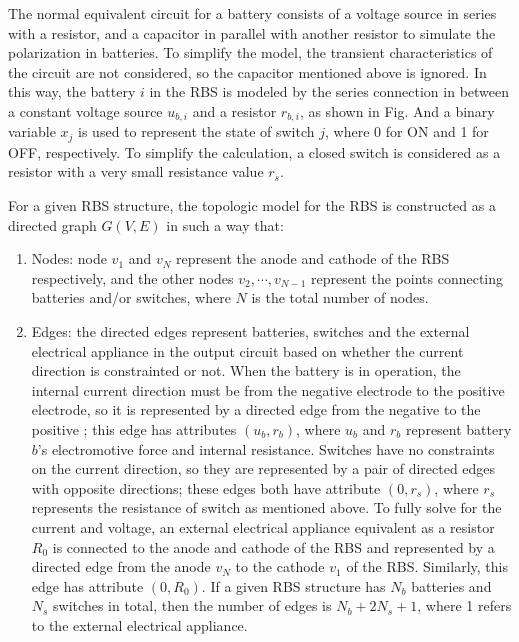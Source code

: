 \documentclass{article}
\begin{document}
The normal equivalent circuit for a battery consists of a voltage source in series with a resistor, and a capacitor in parallel with another resistor to simulate the polarization in batteries.
To simplify the model, the transient characteristics of the circuit are not considered, so the capacitor mentioned above is ignored.
In this way, the battery $i$ in the RBS is modeled by the series connection in between a constant voltage source $u_{b,i}$ and a resistor $r_{b,i}$,  as shown in Fig. %
And a binary variable $x_j$ is used to represent the state of switch $j$, where 0 for ON and 1 for OFF, respectively.
To simplify the calculation, a closed switch is considered as a resistor with a very small resistance value $r_s$.


For a given RBS structure, the topologic model for the RBS is constructed as a directed graph $G(V,E)$ in such a way that:
\begin{enumerate}
    \item Nodes: node $v_1$ and $v_N$ represent the anode and cathode of the RBS respectively, and the other nodes $v_2,\cdots , v_{N-1}$ represent the points connecting batteries and/or switches, where $N$ is the total number of nodes.
    \item Edges: the directed edges represent batteries, switches and the external electrical appliance in the output circuit based on whether the current direction is constrainted or not. 
        When the battery is in operation, the internal current direction must be from the negative electrode to the positive electrode, so it is represented by a directed edge from the negative to the positive ; this edge has attributes $(u_b, r_b)$, where $u_b$ and $r_b$ represent battery $b$'s electromotive force and internal resistance.
        Switches have no constraints on the current direction, so they are represented by a pair of directed edges with opposite directions; these edges both have attribute $(0, r_s)$, where $r_s$ represents the resistance of switch as mentioned above.
        To fully solve for the current and voltage, an external electrical appliance equivalent as a resistor $R_0$ is connected to the anode and cathode of the RBS and represented by a directed edge from the anode $v_N$  to the cathode $v_1$ of the RBS.
        Similarly, this edge has attribute $(0, R_0)$.
        If a given RBS structure has $N_b$ batteries and $N_s$ switches in total, then the number of edges is $N_b+2N_s+1$, where 1 refers to the external electrical appliance.
\end{enumerate}
\end{document}
